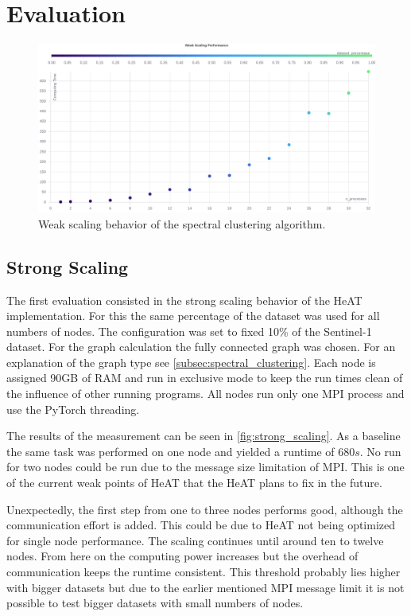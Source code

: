 \section{Evaluation}
\label{sec:evaluation}


\begin{figure}
  \centering
  \includegraphics[width=0.9\linewidth]{images/weak_scaling_chart.pdf}
  \caption{Weak scaling behavior of the spectral clustering algorithm.}\label{fig:weak_scaling}
\end{figure}


\subsection{Strong Scaling}
\label{subsec:strong_scaling}


The first evaluation consisted in the strong scaling behavior of the \gls{HeAT} implementation.
For this the same percentage of the dataset was used for all numbers of nodes.
The configuration was set to fixed 10\% of the Sentinel-1 dataset.
For the graph calculation the fully connected graph was chosen. For an explanation of the graph type see \cref{subsec:spectral_clustering}.
Each node is assigned 90GB of \gls{RAM} and run in exclusive mode to keep the run times clean of the influence of other running programs.
All nodes run only one \gls{MPI} process and use the \gls{PyTorch} threading.

The results of the measurement can be seen in \cref{fig:strong_scaling}. As a baseline the same task was performed on one node and yielded a runtime of \(680s\).
No run for two nodes could be run due to the message size limitation of \gls{MPI}. This is one of the current weak points
of \gls{HeAT} that the \gls{HeAT} plans to fix in the future.

Unexpectedly, the first step from one to three nodes performs good, although the communication effort is added.
This could be due to \gls{HeAT} not being optimized for single node performance.
The scaling continues until around ten to twelve nodes.
From here on the computing power increases but the overhead of communication keeps the runtime consistent.
This threshold probably lies higher with bigger datasets but due to the earlier mentioned \gls{MPI} message limit it is not possible to test
bigger datasets with small numbers of nodes.

